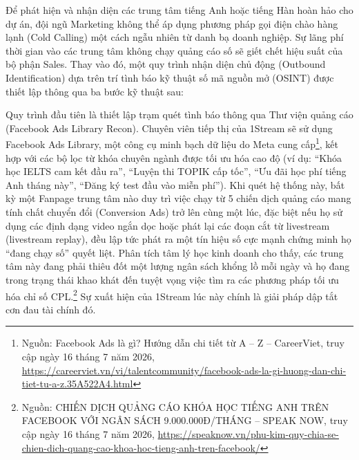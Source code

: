 Để phát hiện và nhận diện các trung tâm tiếng Anh hoặc tiếng Hàn hoàn hảo cho dự án, đội ngũ Marketing không thể áp dụng phương pháp gọi điện chào hàng lạnh (Cold Calling) một cách ngẫu nhiên từ danh bạ doanh nghiệp. Sự lãng phí thời gian vào các trung tâm không chạy quảng cáo số sẽ giết chết hiệu suất của bộ phận Sales. Thay vào đó, một quy trình nhận diện chủ động (Outbound Identification) dựa trên trí tình báo kỹ thuật số mã nguồn mở (OSINT) được thiết lập thông qua ba bước kỹ thuật sau:

Quy trình đầu tiên là thiết lập trạm quét tình báo thông qua Thư viện quảng cáo (Facebook Ads Library Recon). Chuyên viên tiếp thị của 1Stream sẽ sử dụng Facebook Ads Library, một công cụ minh bạch dữ liệu do Meta cung cấp\footnote{Nguồn: Facebook Ads là gì? Hướng dẫn chi tiết từ A -- Z -- CareerViet, truy cập ngày 16 tháng 7 năm 2026, \url{https://careerviet.vn/vi/talentcommunity/facebook-ads-la-gi-huong-dan-chi-tiet-tu-a-z.35A522A4.html}}, kết hợp với các bộ lọc từ khóa chuyên ngành được tối ưu hóa cao độ (ví dụ: ``Khóa học IELTS cam kết đầu ra'', ``Luyện thi TOPIK cấp tốc'', ``Ưu đãi học phí tiếng Anh tháng này'', ``Đăng ký test đầu vào miễn phí''). Khi quét hệ thống này, bất kỳ một Fanpage trung tâm nào duy trì việc chạy từ 5 chiến dịch quảng cáo mang tính chất chuyển đổi (Conversion Ads) trở lên cùng một lúc, đặc biệt nếu họ sử dụng các định dạng video ngắn dọc hoặc phát lại các đoạn cắt từ livestream (livestream replay), đều lập tức phát ra một tín hiệu số cực mạnh chứng minh họ ``đang chạy số'' quyết liệt. Phân tích tâm lý học kinh doanh cho thấy, các trung tâm này đang phải thiêu đốt một lượng ngân sách khổng lồ mỗi ngày và họ đang trong trạng thái khao khát đến tuyệt vọng việc tìm ra các phương pháp tối ưu hóa chỉ số CPL.\footnote{Nguồn: CHIẾN DỊCH QUẢNG CÁO KHÓA HỌC TIẾNG ANH TRÊN FACEBOOK VỚI NGÂN SÁCH 9.000.000Đ/THÁNG -- SPEAK NOW, truy cập ngày 16 tháng 7 năm 2026, \url{https://speaknow.vn/phu-kim-quy-chia-se-chien-dich-quang-cao-khoa-hoc-tieng-anh-tren-facebook/}} Sự xuất hiện của 1Stream lúc này chính là giải pháp dập tắt cơn đau tài chính đó.

